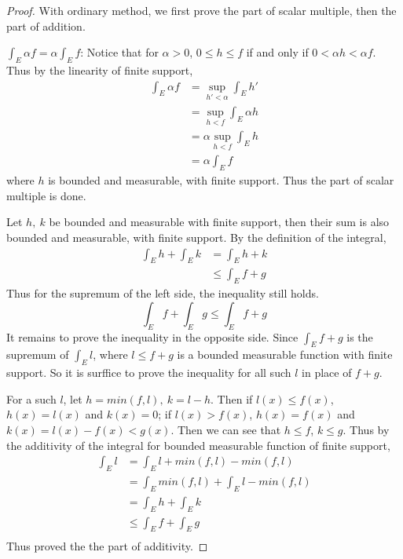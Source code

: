 \documentclass[lang=en, 12pt]{elegantbook}
\begin{document}
            \begin{proof}
                With ordinary method, we first prove the part of scalar multiple, then the part of addition.\par
                $\int_E \alpha f = \alpha \int_E f$: Notice that for $\alpha > 0 $, $0 \leq h \leq f$ if and only if $0<\alpha h < \alpha f$.
            Thus by the linearity of finite support, 
            \begin{equation*}
                \begin{aligned}
                    \int_E \alpha f &= \sup_{h' < \alpha} \int_E h'\\
                    &=\sup_{h < f} \int_E \alpha h \\
                    &= \alpha \sup_{h < f} \int_E h \\
                    &=\alpha \int_E f 
                \end{aligned}
            \end{equation*}
            where $h$ is bounded and measurable, with finite support. Thus the part of scalar multiple is done.\par
            Let $h , \ k$ be bounded and measurable with finite support, then their sum is also bounded and measurable, with finite support.
            By the definition of the integral,
            \begin{equation*}
                \begin{aligned}
                    \int_E h + \int_E k &=\int_E h + k\\
                    &\leq \int_E f+g 
                \end{aligned}
            \end{equation*}
            Thus for the supremum of the left side, the inequality still holds.
            $$\int_E f +\int_E g \leq \int_E f+g$$
            It remains to prove the inequality in the opposite side. Since $\int_E f+g$ is the supremum of $\int_E l$, where $l \leq f+g$
            is a bounded measurable function with finite support. So it is surffice to  prove the inequality for all such $l$ in place of 
            $f+g$.\par
                For a such $l$, let $h = min(f, l), \ k= l-h$. Then if $l(x) \leq f(x)$, $h(x) = l(x)$ and $k(x)= 0$; if $l(x) > f(x)$,
            $h(x)=f(x)$ and $k(x) = l(x)-f(x) < g(x)$. Then we can see that $h \leq f$, $k \leq g$. Thus by the additivity of the integral 
            for bounded measurable function of finite support,
            \begin{equation*}
                \begin{aligned}
                    \int_E l &= \int_E l + min(f, l) - min(f,l)\\
                    &=  \int_E min(f, l) + \int_E l - min(f,l)\\
                    &= \int_E h + \int_E k \\
                    &\leq \int_E f + \int_E g\\
                \end{aligned}
            \end{equation*}
            Thus proved the the part of additivity.
            \end{proof}
\end{document}
